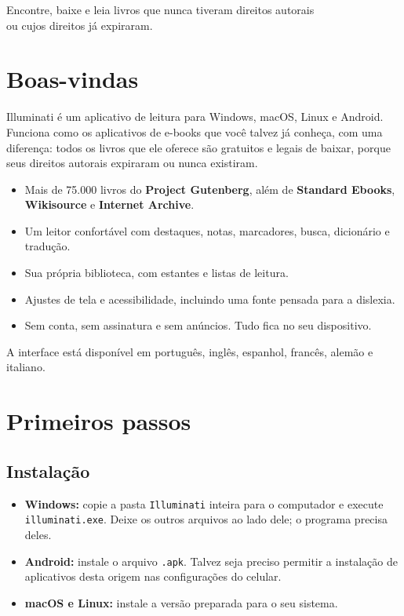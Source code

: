 \documentclass[11pt]{article}
\begin{document}
%
  {Encontre, baixe e leia livros que nunca tiveram direitos autorais\\ou cujos direitos já expiraram.}

{\setcounter{tocdepth}{1}\tableofcontents}
\newpage

\section{Boas-vindas}

Illuminati é um aplicativo de leitura para Windows, macOS, Linux e Android. Funciona como os
aplicativos de e-books que você talvez já conheça, com uma diferença: todos os livros que ele
oferece são gratuitos e legais de baixar, porque seus direitos autorais expiraram ou nunca
existiram.

\begin{itemize}
  \item Mais de 75.000 livros do \textbf{Project Gutenberg}, além de \textbf{Standard Ebooks},
        \textbf{Wikisource} e \textbf{Internet Archive}.
  \item Um leitor confortável com destaques, notas, marcadores, busca, dicionário e tradução.
  \item Sua própria biblioteca, com estantes e listas de leitura.
  \item Ajustes de tela e acessibilidade, incluindo uma fonte pensada para a dislexia.
  \item Sem conta, sem assinatura e sem anúncios. Tudo fica no seu dispositivo.
\end{itemize}

A interface está disponível em português, inglês, espanhol, francês, alemão e italiano.

\section{Primeiros passos}

\subsection{Instalação}
\begin{itemize}
  \item \textbf{Windows:} copie a pasta \texttt{Illuminati} inteira para o computador e execute
        \texttt{illuminati.exe}. Deixe os outros arquivos ao lado dele; o programa precisa deles.
  \item \textbf{Android:} instale o arquivo \texttt{.apk}. Talvez seja preciso permitir a
        instalação de aplicativos desta origem nas configurações do celular.
  \item \textbf{macOS e Linux:} instale a versão preparada para o seu sistema.
\end{itemize}
\end{document}
